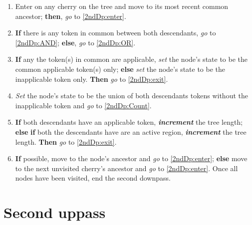 \documentclass[a4paper,12pt]{article}
\begin{document}
\begin{enumerate}
    \item  Enter on any cherry on the tree and move to its most recent common ancestor; \textbf{then}, \textit{go} to \ref{2ndDp:enter}.



    \item \label{2ndDp:enter} \textbf{If} there is any token in common between both descendants, \textit{go} to \ref{2ndDp:AND}; \textbf{else}, \textit{go} to \ref{2ndDp:OR}.
    \item \label{2ndDp:AND} \textbf{If} any the token(s) in common are applicable, \textit{set} the node's state to be the common applicable token(s) only; \textbf{else} \textit{set} the node's state to be the inapplicable token only. \textbf{Then} \textit{go} to \ref{2ndDp:exit}. 
    \item \label{2ndDp:OR} \textit{Set} the node's state to be the union of both descendants tokens without the inapplicable token and \textit{go} to \ref{2ndDp:Count}.
    \item \label{2ndDp:Count}  \textbf{If} both descendants have an applicable token, \textbf{\textit{increment}} the tree length; \textbf{else} \textbf{if} both the descendants have are an active region, \textbf{\textit{increment}} the tree length. \textbf{Then} \textit{go} to \ref{2ndDp:exit}. %
    \item \label{2ndDp:exit} \textbf{If} possible, move to the node's ancestor and \textit{go} to \ref{2ndDp:enter}; \textbf{else} move to the next unvisited cherry's ancestor and \textit{go} to \ref{2ndDp:enter}. Once all nodes have been visited, end the second downpass.
\end{enumerate}

\section{Second uppass} \label{2ndUp}
\end{document}
